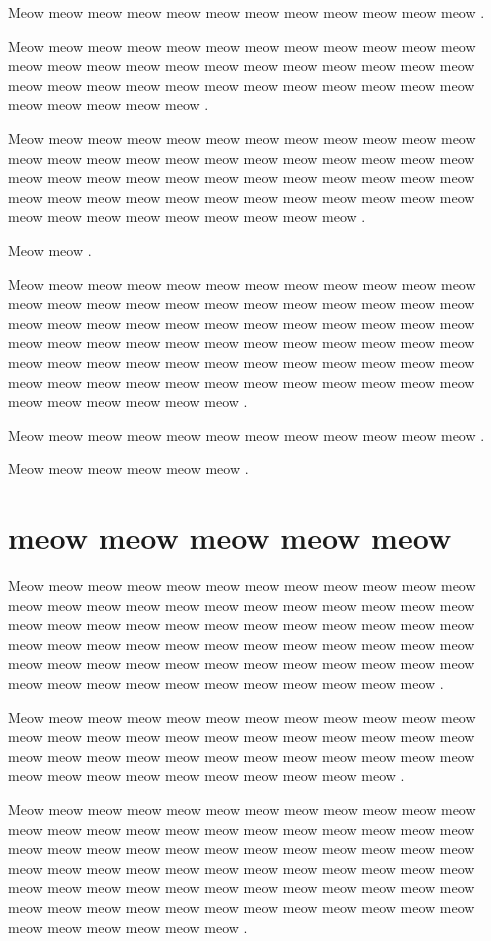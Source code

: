\documentclass[12pt, a5paper, openany]{book}
\begin{document}
Meow meow meow meow meow meow meow meow meow meow meow meow .

Meow meow meow meow meow meow meow meow meow meow meow meow meow meow meow meow meow meow meow meow meow meow meow meow meow meow meow meow meow meow meow meow meow meow meow meow meow meow meow meow meow .

Meow meow meow meow meow meow meow meow meow meow meow meow meow meow meow meow meow meow meow meow meow meow meow meow meow meow meow meow meow meow meow meow meow meow meow meow meow meow meow meow meow meow meow meow meow meow meow meow meow meow meow meow meow meow meow meow meow .

Meow meow .

Meow meow meow meow meow meow meow meow meow meow meow meow meow meow meow meow meow meow meow meow meow meow meow meow meow meow meow meow meow meow meow meow meow meow meow meow meow meow meow meow meow meow meow meow meow meow meow meow meow meow meow meow meow meow meow meow meow meow meow meow meow meow meow meow meow meow meow meow meow meow meow meow meow meow meow meow meow meow .

Meow meow meow meow meow meow meow meow meow meow meow meow .

Meow meow meow meow meow meow .



\chapter{meow meow meow meow meow }Meow meow meow meow meow meow meow meow meow meow meow meow meow meow meow meow meow meow meow meow meow meow meow meow meow meow meow meow meow meow meow meow meow meow meow meow meow meow meow meow meow meow meow meow meow meow meow meow meow meow meow meow meow meow meow meow meow meow meow meow meow meow meow meow meow meow meow meow meow meow meow .

Meow meow meow meow meow meow meow meow meow meow meow meow meow meow meow meow meow meow meow meow meow meow meow meow meow meow meow meow meow meow meow meow meow meow meow meow meow meow meow meow meow meow meow meow meow meow .

Meow meow meow meow meow meow meow meow meow meow meow meow meow meow meow meow meow meow meow meow meow meow meow meow meow meow meow meow meow meow meow meow meow meow meow meow meow meow meow meow meow meow meow meow meow meow meow meow meow meow meow meow meow meow meow meow meow meow meow meow meow meow meow meow meow meow meow meow meow meow meow meow meow meow meow meow meow meow .
\end{document}
